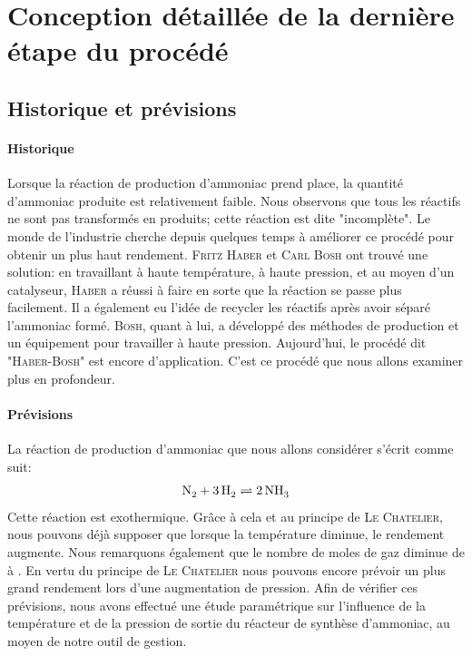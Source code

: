 \section{Conception détaillée de la dernière étape du procédé}
\subsection{Historique et prévisions}

\paragraph{Historique} 
Lorsque la réaction de production d'ammoniac prend place, la quantité d'ammoniac produite est relativement faible.
Nous observons que tous les réactifs ne sont pas transformés en produits; cette réaction est dite "incomplète".
Le monde de l'industrie cherche depuis quelques temps à améliorer ce procédé pour obtenir un plus haut rendement.
\textsc{Fritz Haber} et \textsc{Carl Bosh} ont trouvé une solution: en travaillant à haute température, à haute pression, et au moyen
d'un catalyseur, \textsc{Haber} a réussi à faire en sorte que la réaction se passe plus facilement.\cite{HABER} Il a également eu l'idée
de recycler les réactifs après avoir séparé l'ammoniac formé. \textsc{Bosh}, quant à lui, a développé des méthodes de
production et un équipement pour travailler à haute pression.\cite{tce} Aujourd'hui, le procédé dit "\textsc{Haber-Bosh}" est encore
d'application. C'est ce procédé que nous allons examiner plus en profondeur.

\paragraph{Prévisions}
La réaction de production d'ammoniac que nous allons considérer s'écrit comme suit:
$$\ce{N2} + \ce{3H2} \rightleftharpoons \ce{2NH3}$$
Cette réaction est exothermique. Grâce à cela et au principe de \textsc{Le Chatelier}, nous pouvons déjà supposer que lorsque
la température diminue, le rendement augmente. Nous remarquons également que le nombre de moles de gaz diminue de  à
. En vertu du principe de \textsc{Le Chatelier} nous pouvons encore prévoir un plus grand rendement lors d'une augmentation de
pression. Afin de vérifier ces prévisions, nous avons effectué une étude paramétrique sur l'influence de la température et de la
pression de sortie du réacteur de synthèse d'ammoniac, au moyen de notre outil de gestion.

